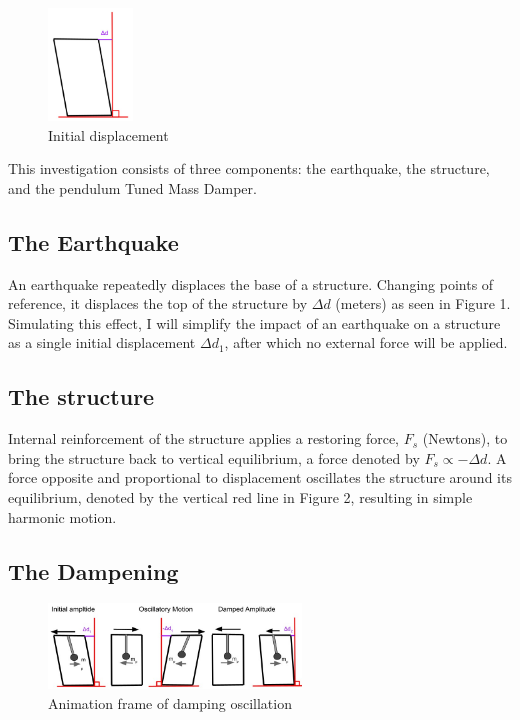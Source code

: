 \documentclass[11pt]{article}
\begin{document}
\begin{figure}
\vspace{-15pt}
\centering
\includegraphics[width=0.2\textwidth]{img/fig1.jpg}
\caption{\label{fig:1}Initial displacement}
\vspace{-50pt}
\end{figure}

This investigation consists of three components: the earthquake, the structure, and the pendulum Tuned Mass Damper.

\subsection{The Earthquake}

An earthquake repeatedly displaces the base of a structure. Changing points of reference, it displaces the top of the structure by $\Delta d$ (meters) as seen in Figure 1. Simulating this effect, I will simplify the impact of an earthquake on a structure as a single initial displacement $\Delta d_1$, after which no external force will be applied.


\subsection{The structure}

Internal reinforcement of the structure applies a restoring force, $F_s$ (Newtons), to bring the structure back to vertical equilibrium, a force denoted by $F_s \propto -\Delta d$. A force opposite and proportional to displacement oscillates the structure around its equilibrium, denoted by the vertical red line in Figure 2, resulting in simple harmonic motion. 



\subsection{The Dampening}

\begin{figure}
\centering
\includegraphics[width=0.6\textwidth]{img/fig2.jpg}
\caption{\label{fig:2}Animation frame of damping oscillation}
\vspace{-10pt}
\end{figure}
\end{document}
